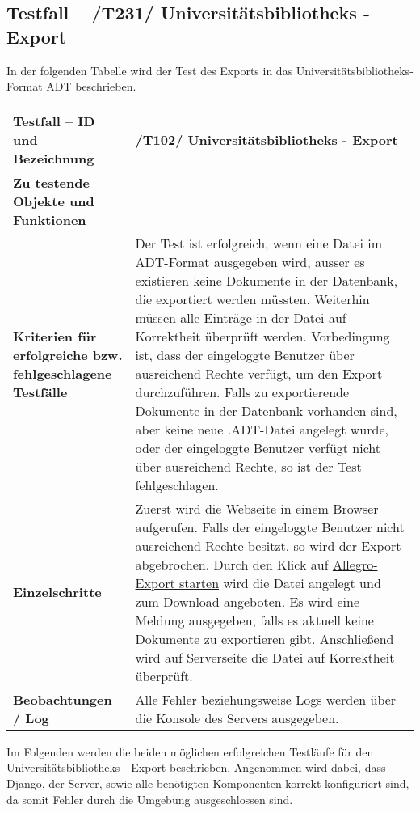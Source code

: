 \subsection{Testfall -- /T231/ Universitätsbibliotheks - Export}
In der folgenden Tabelle wird der Test des Exports in das
Universitätsbibliotheks-Format ADT beschrieben.
\begin{longtable}{|p{5cm}|p{10cm}|}
\hline
\textbf{Testfall -- ID und Bezeichnung} &  \textnormal{/T102/ Universitätsbibliotheks - Export} \\
\hline
\textbf{Zu testende Objekte und Funktionen} & 
\textnormal{
\begin{itemize}
  \item In Komponente \textit{Server (App: Documents)} die Funktion
	\lstinline{extras_allegro.export_allegro()}
\end{itemize} } \\
\hline
\textbf{Kriterien f\"ur erfolgreiche bzw. fehlgeschlagene Testf\"alle} &
\textnormal{Der Test ist erfolgreich, wenn eine Datei im ADT-Format ausgegeben
wird, ausser es existieren keine Dokumente in der Datenbank, die exportiert
werden müssten. Weiterhin müssen alle Einträge in der Datei auf Korrektheit
überprüft werden. Vorbedingung ist, dass der eingeloggte Benutzer über
ausreichend Rechte verfügt, um den Export durchzuführen. Falls zu exportierende
Dokumente in der Datenbank vorhanden sind, aber keine neue .ADT-Datei angelegt
wurde, oder der eingeloggte Benutzer verfügt nicht über ausreichend Rechte, so
ist der Test fehlgeschlagen. } \\
\hline
\textbf{Einzelschritte} & 
\textnormal{Zuerst wird die Webseite in einem Browser aufgerufen. Falls der
eingeloggte Benutzer nicht ausreichend Rechte besitzt, so wird der Export
abgebrochen. Durch den Klick auf \uline{Allegro-Export starten} wird die Datei angelegt und
zum Download angeboten. Es wird eine Meldung ausgegeben, falls es aktuell keine
Dokumente zu exportieren gibt. Anschließend wird auf Serverseite die Datei auf
Korrektheit überprüft. } \\
\hline
\textbf{Beobachtungen / Log} &  \textnormal{Alle Fehler beziehungsweise Logs werden
über die Konsole des Servers ausgegeben. } \\
\hline

 \end{longtable}

Im Folgenden werden die beiden möglichen erfolgreichen Testläufe für den
Universitätsbibliotheks - Export beschrieben. Angenommen wird dabei, dass
Django, der Server, sowie alle benötigten Komponenten korrekt konfiguriert
sind, da somit Fehler durch die Umgebung ausgeschlossen sind.

